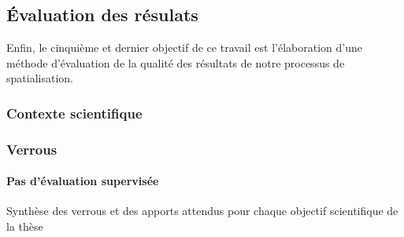 \subsection{Évaluation des résulats}
\label{subsec:2-1-5}

Enfin, le cinquième et dernier objectif de ce travail est
l'élaboration d'une méthode d'évaluation de la qualité des résultats
de notre processus de spatialisation.

\subsubsection{Contexte scientifique}

\subsubsection{Verrous}

\paragraph{Pas d'évaluation supervisée}


\begin{table}
  \centering
  
  \caption{Synthèse des verrous et des apports attendus pour chaque
    objectif scientifique de la thèse}
  \label{tab:synthese_objectifs}
\end{table}

